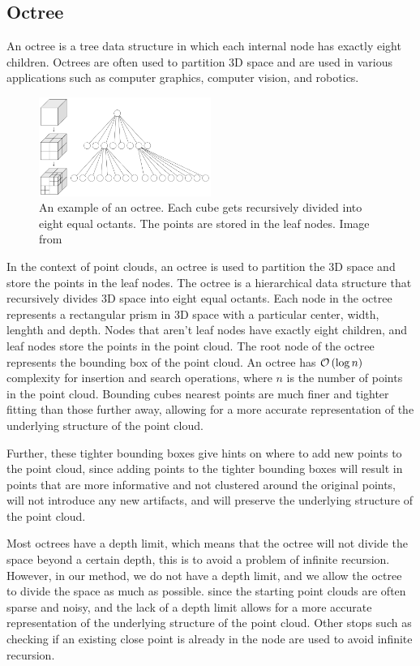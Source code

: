 \subsection{Octree}

An octree is a tree data structure in which each internal node has exactly eight children. 
Octrees are often used to partition 3D space and are used in various applications such as computer graphics, computer vision, and robotics.

\begin{figure}[H]
	\centering
	\includegraphics[width=0.5\textwidth]{octree.png}
	\caption{An example of an octree. Each cube gets recursively divided into eight equal octants. The points are stored in the leaf nodes. Image from \cite{octree_diagram}}
	\label{fig:octree}
\end{figure}

In the context of point clouds, an octree is used to partition the 3D space and store the points in the leaf nodes.
The octree is a hierarchical data structure that recursively divides 3D space into eight equal octants.
Each node in the octree represents a rectangular prism in 3D space with a particular center, width, lenghth and depth.
Nodes that aren't leaf nodes have exactly eight children, and leaf nodes store the points in the point cloud.
The root node of the octree represents the bounding box of the point cloud.
An octree has $\mathcal{O}\left(\log n\right)$ complexity for insertion and search operations, where $n$ is the number of points in the point cloud.
Bounding cubes nearest points are much finer and tighter fitting than those further away, allowing for a more accurate representation of the underlying structure of the point cloud.

Further, these tighter bounding boxes give hints on where to add new points to the point cloud, since adding points to the tighter bounding boxes will result in points that are more informative and not clustered around the original points, will not introduce any new artifacts, and will preserve the underlying structure of the point cloud.

Most octrees have a depth limit, which means that the octree will not divide the space beyond a certain depth, this is to avoid a problem of infinite recursion.
However, in our method, we do not have a depth limit, and we allow the octree to divide the space as much as possible.
since the starting point clouds are often sparse and noisy, and the lack of a depth limit allows for a more accurate representation of the underlying structure of the point cloud.
Other stops such as checking if an existing close point is already in the node are used to avoid infinite recursion.


